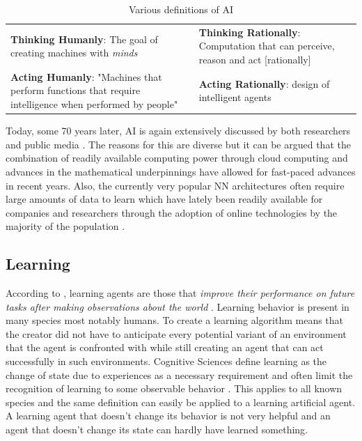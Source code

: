\begin{table}[] 
    \renewcommand{\arraystretch}{2.5}
    \centering
    \begin{tabular}{p{}|p{}} 
        \textbf{Thinking Humanly}: The goal of creating machines with \emph{minds}
&   
        \textbf{Thinking Rationally}: Computation that can perceive, reason and act [rationally]
\\
            \textbf{Acting Humanly}: "Machines that perform functions that require intelligence when performed by people"
&
        \textbf{Acting Rationally}:  design of intelligent agents
    \end{tabular}
    \caption{Various definitions of \ac {AI} \citep{russell2016artificial}  }
    \label{tab:ai_definitions}
\end{table}

Today, some 70 years later, \ac {AI} is again extensively discussed by both researchers and public media
\citep[p.24ff.]{russell2016artificial, arulkumaran2017brief}. The reasons for this are diverse but it can be argued that
the combination of readily available computing power through cloud computing and advances in the mathematical
underpinnings have allowed for fast-paced advances in recent years. Also, the currently very popular \acf {NN}
architectures often require large amounts of data to learn which have lately been readily available for companies and
researchers through the adoption of online technologies by the majority of the population
\citep[p.27]{russell2016artificial}.
\subsection{Learning}

According to \cite{russell2016artificial}, learning agents are those that \emph{improve their performance on future
tasks after making observations about the world} \cite[p.693]{russell2016artificial}. Learning behavior is present in
many species most notably humans. To create a learning algorithm means that the creator did not have to anticipate every
potential variant of an environment that the agent is confronted with while still creating an agent that can act
successfully in such environments. Cognitive Sciences define learning as the change of state due to experiences as a
necessary requirement and often limit the recognition of learning to some observable behavior
\cite[p.96f.]{cognition1999}. This applies to all known species and the same definition can easily be applied to a
learning artificial agent. A learning agent that doesn't change its behavior is not very helpful and an agent that
doesn't change its state can hardly have learned something. 

